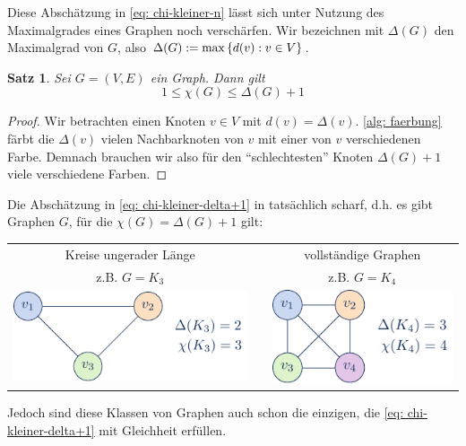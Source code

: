 \documentclass[ngerman, a4paper, 12pt]{article}
\newcounter{themcount}
\theoremstyle{plain}
\newtheorem{satz}[themcount]{Satz}
\theoremstyle{break}
\theoremstyle{proofstyle}
\newtheorem{proof}{Beweis}
\begin{document}
	Diese Abschätzung in \cref{eq: chi-kleiner-n} lässt sich unter Nutzung des Maximalgrades eines Graphen noch verschärfen. Wir bezeichnen mit $\Delta(G)$ den Maximalgrad von $G$, also $\Delta(G) \mathrel{:=} \max\left\{ d(v) : v \in V \right\}$.
	
	\begin{satz}
		Sei $G = (V,E)$ ein Graph. Dann gilt
		\begin{equation}
			1 \le \chi(G) \le \Delta(G) + 1
			\label{eq: chi-kleiner-delta+1}
		\end{equation}
	\end{satz}
	\begin{proof}
		Wir betrachten einen Knoten $v \in V$ mit $d(v) = \Delta(v)$. \cref{alg: faerbung} färbt die $\Delta(v)$ vielen Nachbarknoten von $v$ mit einer von $v$ verschiedenen Farbe. Demnach brauchen wir also für den \enquote{schlechtesten} Knoten $\Delta(G) + 1$ viele verschiedene Farben.
	\end{proof}
	
	Die Abschätzung in \cref{eq: chi-kleiner-delta+1} in tatsächlich scharf, d.h. es gibt Graphen $G$, für die $\chi(G) = \Delta(G) + 1$ gilt:
	\begin{center}
		\begin{tabular}{ccc}
			Kreise ungerader Länge && vollständige Graphen \\
			z.B. $G = K_3$ & & z.B. $G = K_4$ \\
			\includegraphics[scale=1]{k3.pdf} 
			& \hspace{3em} &
			\includegraphics[scale=1]{k4.pdf}
		\end{tabular}
	\end{center}
	
	Jedoch sind diese Klassen von Graphen auch schon die einzigen, die \cref{eq: chi-kleiner-delta+1} mit Gleichheit erfüllen.
	
\end{document}
